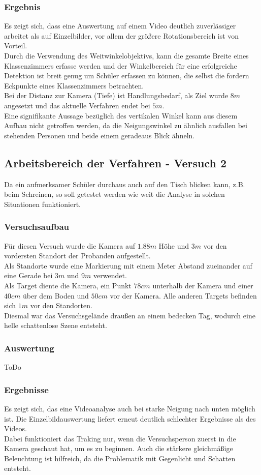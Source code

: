 \subsubsection{Ergebnis}
Es zeigt sich, dass eine Auswertung auf einem Video deutlich zuverlässiger arbeitet als auf Einzelbilder, vor allem der größere Rotationsbereich ist von Vorteil.\\
Durch die Verwendung des Weitwinkelobjektivs, kann die gesamte Breite eines Klassenzimmers erfasse werden und der Winkelbereich für eine erfolgreiche Detektion ist breit genug um Schüler erfassen zu können, die selbst die fordern Eckpunkte eines Klassenzimmers betrachten.\\
Bei der Distanz zur Kamera (Tiefe) ist Handlungsbedarf, als Ziel wurde $8m$ angesetzt und das aktuelle Verfahren endet bei $5m$.\\
Eine signifikante Aussage bezüglich des vertikalen Winkel kann aus diesem Aufbau nicht getroffen werden, da die Neigungswinkel zu ähnlich ausfallen bei stehenden Personen und beide einem geradeaus Blick ähneln.
\subsection{Arbeitsbereich der Verfahren - Versuch 2}
Da ein aufmerksamer Schüler durchaus auch auf den Tisch blicken kann, z.B. beim Schreinen, so soll getestet werden wie weit die Analyse in solchen Situationen funktioniert.
\subsubsection{Versuchsaufbau}
Für diesen Versuch wurde die Kamera auf $1.88m$ Höhe und $3m$ vor den vordersten Standort der Probanden aufgestellt.\\
Als Standorte wurde eine Markierung mit einem Meter Abstand zueinander auf eine Gerade bei $3m$ und $9m$ verwendet.\\
Als Target diente die Kamera, ein Punkt $78cm$ unterhalb der Kamera und einer $40cm$ über dem Boden und $50cm$ vor der Kamera. Alle anderen Targets befinden sich $1m$ vor den Standorten.\\
Diesmal war das Versuchsgelände draußen an einem bedecken Tag, wodurch eine helle schattenlose Szene entsteht.
\subsubsection{Auswertung}
ToDo
\subsubsection{Ergebnisse}
Es zeigt sich, das eine Videoanalyse auch bei starke Neigung nach unten möglich ist. Die Einzelbildauswertung liefert erneut deutlich schlechter Ergebnisse als des Videos.\\
Dabei funktioniert das Traking nur, wenn die Versuchsperson zuerst in die Kamera geschaut hat, um es zu beginnen. Auch die stärkere gleichmäßige Beleuchtung ist hilfreich, da die Problematik mit Gegenlicht und Schatten entsteht.
